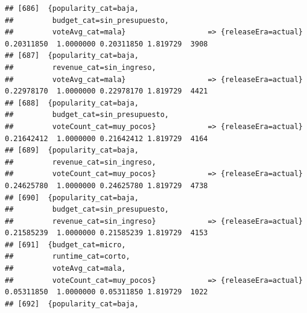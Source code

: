 \documentclass[
]{article}
\begin{document}
\begin{verbatim}
## [686]  {popularity_cat=baja,                                                                                                    
##         budget_cat=sin_presupuesto,                                                                                             
##         voteAvg_cat=mala}                   => {releaseEra=actual}               0.20311850  1.0000000 0.20311850 1.819729  3908
## [687]  {popularity_cat=baja,                                                                                                    
##         revenue_cat=sin_ingreso,                                                                                                
##         voteAvg_cat=mala}                   => {releaseEra=actual}               0.22978170  1.0000000 0.22978170 1.819729  4421
## [688]  {popularity_cat=baja,                                                                                                    
##         budget_cat=sin_presupuesto,                                                                                             
##         voteCount_cat=muy_pocos}            => {releaseEra=actual}               0.21642412  1.0000000 0.21642412 1.819729  4164
## [689]  {popularity_cat=baja,                                                                                                    
##         revenue_cat=sin_ingreso,                                                                                                
##         voteCount_cat=muy_pocos}            => {releaseEra=actual}               0.24625780  1.0000000 0.24625780 1.819729  4738
## [690]  {popularity_cat=baja,                                                                                                    
##         budget_cat=sin_presupuesto,                                                                                             
##         revenue_cat=sin_ingreso}            => {releaseEra=actual}               0.21585239  1.0000000 0.21585239 1.819729  4153
## [691]  {budget_cat=micro,                                                                                                       
##         runtime_cat=corto,                                                                                                      
##         voteAvg_cat=mala,                                                                                                       
##         voteCount_cat=muy_pocos}            => {releaseEra=actual}               0.05311850  1.0000000 0.05311850 1.819729  1022
## [692]  {popularity_cat=baja,                                                                                                    

\end{verbatim}
\end{document}
